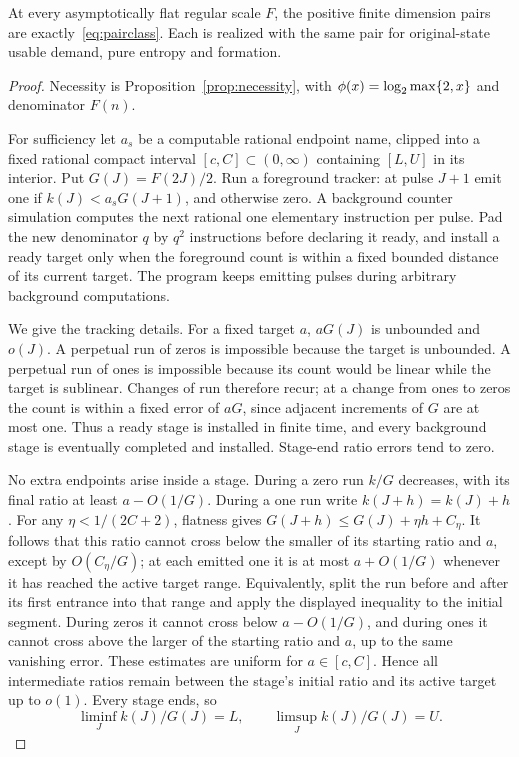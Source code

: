 \begin{theorem}\label{thm:regular-pairs}
At every asymptotically flat regular scale $F$, the positive finite dimension pairs are exactly~\eqref{eq:pairclass}. Each is realized with the same pair for original-state usable demand, pure entropy and formation.
\end{theorem}
\begin{proof}
Necessity is Proposition~\ref{prop:necessity}, with $\phi(x)=\log_2\max\{2,x\}$ and denominator $F(n)$.

For sufficiency let $a_s$ be a computable rational endpoint name, clipped into a fixed rational compact interval $[c,C]\subset(0,\infty)$ containing $[L,U]$ in its interior. Put $G(J)=F(2J)/2$. Run a foreground tracker: at pulse $J+1$ emit one if $k(J)<a_sG(J+1)$, and otherwise zero. A background counter simulation computes the next rational one elementary instruction per pulse. Pad the new denominator $q$ by $q^2$ instructions before declaring it ready, and install a ready target only when the foreground count is within a fixed bounded distance of its current target. The program keeps emitting pulses during arbitrary background computations.

We give the tracking details. For a fixed target $a$, $aG(J)$ is unbounded and $o(J)$. A perpetual run of zeros is impossible because the target is unbounded. A perpetual run of ones is impossible because its count would be linear while the target is sublinear. Changes of run therefore recur; at a change from ones to zeros the count is within a fixed error of $aG$, since adjacent increments of $G$ are at most one. Thus a ready stage is installed in finite time, and every background stage is eventually completed and installed. Stage-end ratio errors tend to zero.

No extra endpoints arise inside a stage. During a zero run $k/G$ decreases, with its final ratio at least $a-O(1/G)$. During a one run write $k(J+h)=k(J)+h$. For any $\eta<1/(2C+2)$, flatness gives $G(J+h)\le G(J)+\eta h+C_\eta$. It follows that this ratio cannot cross below the smaller of its starting ratio and $a$, except by $O(C_\eta/G)$; at each emitted one it is at most $a+O(1/G)$ whenever it has reached the active target range. Equivalently, split the run before and after its first entrance into that range and apply the displayed inequality to the initial segment. During zeros it cannot cross below $a-O(1/G)$, and during ones it cannot cross above the larger of the starting ratio and $a$, up to the same vanishing error. These estimates are uniform for $a\in[c,C]$. Hence all intermediate ratios remain between the stage's initial ratio and its active target up to $o(1)$. Every stage ends, so
\[
 \liminf_J k(J)/G(J)=L,\qquad \limsup_J k(J)/G(J)=U.
\]


\end{proof}
